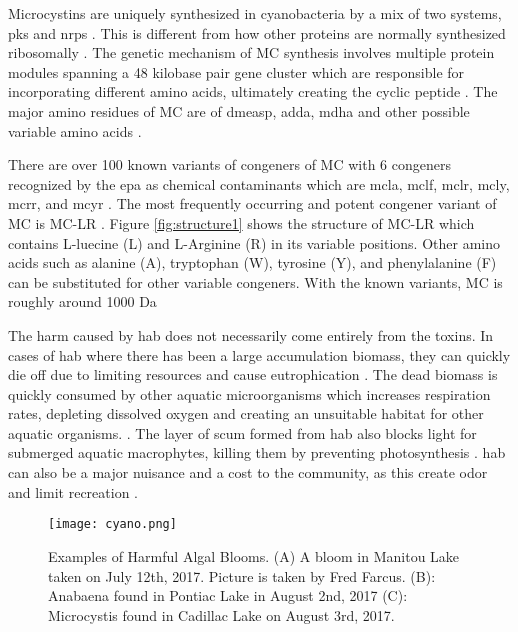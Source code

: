 Microcystins are uniquely synthesized in cyanobacteria by a mix of two systems, \gls{pks} and  \gls{nrps} \cite{tillett_structural_2000}. This is different from how other proteins are normally synthesized ribosomally . The genetic mechanism of MC synthesis involves multiple protein modules spanning a 48 kilobase pair gene cluster which are responsible for incorporating different amino acids, ultimately creating the cyclic peptide \cite{moffitt_characterization_2004,nishizawa_genetic_1999}. The major amino residues of MC  are of \gls{dmeasp}, \gls{adda},  \gls{mdha} and other possible variable amino acids \cite{trogen_conformational_1996,nishizawa_genetic_1999}.

There are over 100 known variants of congeners of MC with 6 congeners recognized by the \gls{epa} as chemical contaminants which are \gls{mcla}, \gls{mclf}, \gls{mclr}, \gls{mcly}, \gls{mcrr}, and \gls{mcyr} \cite{puddick_modulation_2016}. The most frequently occurring and potent congener variant of MC is MC-LR \cite{rastogi_cyanotoxin-microcystins:_2014}. Figure \ref{fig:structure1} shows the structure of MC-LR which contains L-luecine (L) and L-Arginine (R) in its variable positions. Other amino acids such as alanine (A), tryptophan (W), tyrosine (Y), and phenylalanine (F) can be substituted for other variable congeners. With the known variants, MC is roughly around 1000 Da \cite{dittmann_cyanobacterial_2012}

The harm caused by \gls{hab} does not necessarily come entirely from the toxins. In cases of \gls{hab} where there has been a large accumulation biomass, they can quickly die off due to limiting resources and cause eutrophication \cite{charlton_oxygen_1980}. The dead biomass is quickly consumed by other aquatic microorganisms which increases respiration rates, depleting dissolved oxygen and creating an unsuitable habitat for other aquatic organisms.  \cite{anderson_harmful_2002}. The layer of scum formed from \gls{hab} also blocks light for submerged aquatic macrophytes, killing them by preventing photosynthesis \cite{ bucak_modeling_2018}. \gls{hab} can also be a major nuisance and a cost to the community, as this create odor and limit recreation \cite{graham_cyanotoxin_2010, carmichael_health_2016}.


\begin{figure}[!h]
	\texttt{[image: cyano.png]}
	\caption{
		Examples of Harmful Algal Blooms. (A) A bloom in Manitou Lake taken on July 12th, 2017. Picture is taken by Fred Farcus. (B): Anabaena found in Pontiac Lake in August 2nd, 2017  (C): Microcystis found in Cadillac Lake on August 3rd, 2017.
	}
	\label{fig:cyano}
\end{figure}


